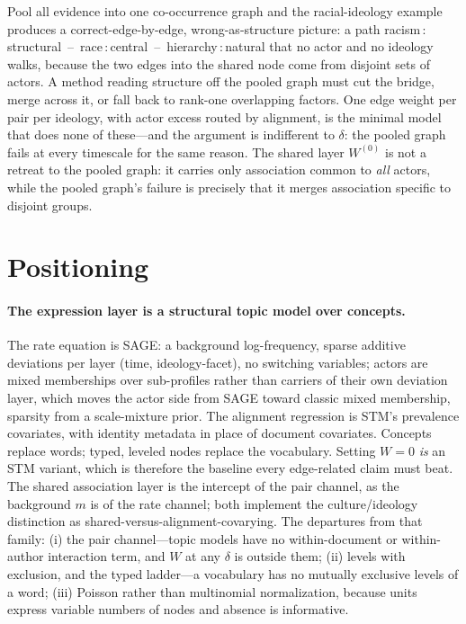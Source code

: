 \documentclass[11pt]{article}
\newcommand{\1}{\mathbb{1}}
\newcommand{\node}[2]{\textsf{#1\,:\,#2}}
\begin{document}
Pool all evidence into one co-occurrence graph and the racial-ideology example produces a correct-edge-by-edge, wrong-as-structure picture: a path \node{racism}{structural}~--~\node{race}{central}~--~\node{hierarchy}{natural} that no actor and no ideology walks, because the two edges into the shared node come from disjoint sets of actors. A method reading structure off the pooled graph must cut the bridge, merge across it, or fall back to rank-one overlapping factors. One edge weight per pair per ideology, with actor excess routed by alignment, is the minimal model that does none of these---and the argument is indifferent to $\delta$: the pooled graph fails at every timescale for the same reason. The shared layer $W^{(0)}$ is not a retreat to the pooled graph: it carries only association common to \emph{all} actors, while the pooled graph's failure is precisely that it merges association specific to disjoint groups.

\section{Positioning}\label{sec:related}

\paragraph{The expression layer is a structural topic model over concepts.} The rate equation is SAGE: a background log-frequency, sparse additive deviations per layer (time, ideology-facet), no switching variables; actors are mixed memberships over sub-profiles rather than carriers of their own deviation layer, which moves the actor side from SAGE toward classic mixed membership, sparsity from a scale-mixture prior. The alignment regression is STM's prevalence covariates, with identity metadata in place of document covariates. Concepts replace words; typed, leveled nodes replace the vocabulary. Setting $W=0$ \emph{is} an STM variant, which is therefore the baseline every edge-related claim must beat. The shared association layer is the intercept of the pair channel, as the background $m$ is of the rate channel; both implement the culture/ideology distinction as shared-versus-alignment-covarying. The departures from that family: (i) the pair channel---topic models have no within-document or within-author interaction term, and $W$ at any $\delta$ is outside them; (ii) levels with exclusion, and the typed ladder---a vocabulary has no mutually exclusive levels of a word; (iii) Poisson rather than multinomial normalization, because units express variable numbers of nodes and absence is informative.
\end{document}
